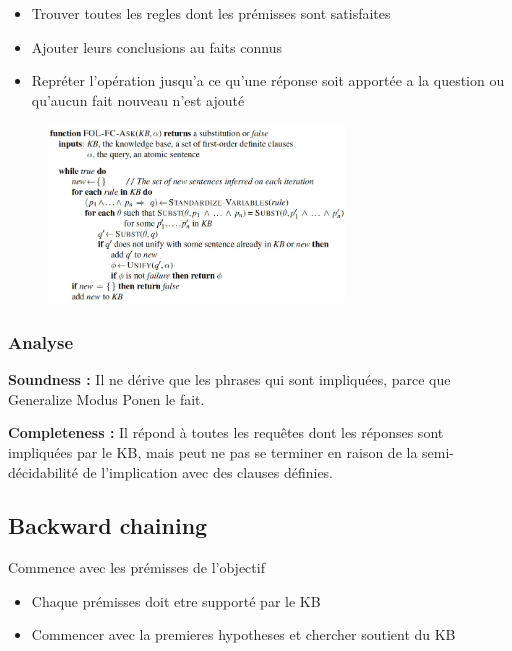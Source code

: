 \documentclass[12pt]{article}
\begin{document}
		\begin{itemize}
			\item Trouver toutes les regles dont les prémisses sont satisfaites
			\item Ajouter leurs conclusions au faits connus
			\item Repréter l'opération jusqu'a ce qu'une réponse soit apportée a la question  ou qu'aucun fait nouveau n'est ajouté
			
		\end{itemize}	
		
		\begin{figure}[htp]	
			\centering
			\includegraphics[width=0.7\textwidth]{img/ForwardChaining.png}
		\end{figure}		
		
		\subsubsection{Analyse}
			\textbf{Soundness :} Il ne dérive que les phrases qui sont impliquées, parce que Generalize Modus Ponen le fait.
			
			\textbf{Completeness :} Il répond à toutes les requêtes dont les réponses sont impliquées par le KB, mais peut ne pas se terminer en raison de la semi-décidabilité de l'implication avec des clauses définies.
			
	\subsection{Backward chaining}
		Commence  avec les prémisses de l'objectif
		\begin{itemize}
			\item Chaque prémisses doit etre supporté par le KB
			\item Commencer avec la premieres hypotheses et chercher soutient du KB
			
		\end{itemize}
		
\end{document}
